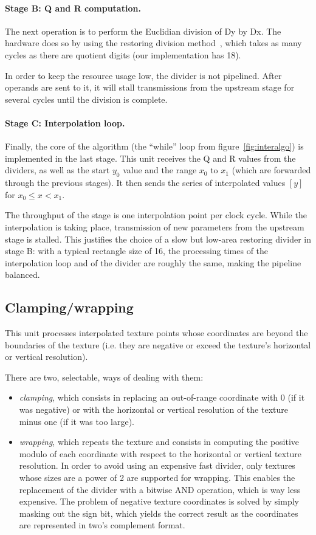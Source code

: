 \documentclass[a4paper,11pt]{kthesis}
\begin{document}
\paragraph{Stage B: Q and R computation.} The next operation is to perform the Euclidian division of Dy by Dx. The hardware does so by using the restoring division method~\cite{restdiv}, which takes as many cycles as there are quotient digits (our implementation has 18).

In order to keep the resource usage low, the divider is not pipelined. After operands are sent to it, it will stall transmissions from the upstream stage for several cycles until the division is complete.

\paragraph{Stage C: Interpolation loop.}
Finally, the core of the algorithm (the ``while'' loop from figure~\ref{fig:interalgo}) is implemented in the last stage. This unit receives the Q and R values from the dividers, as well as the start $y_{0}$ value and the range $x_{0}$ to $x_{1}$ (which are forwarded through the previous stages). It then sends the series of interpolated values $[y]$ for $x_{0} \leq x < x_{1}$.

The throughput of the stage is one interpolation point per clock cycle. While the interpolation is taking place, transmission of new parameters from the upstream stage is stalled. This justifies the choice of a slow but low-area restoring divider in stage B: with a typical rectangle size of 16, the processing times of the interpolation loop and of the divider are roughly the same, making the pipeline balanced.

\subsection{Clamping/wrapping}
This unit processes interpolated texture points whose coordinates are beyond the boundaries of the texture (i.e. they are negative or exceed the texture's horizontal or vertical resolution).

There are two, selectable, ways of dealing with them:
\begin{itemize}
\item \textit{clamping}, which consists in replacing an out-of-range coordinate with 0 (if it was negative) or with the horizontal or vertical resolution of the texture minus one (if it was too large).
\item \textit{wrapping}, which repeats the texture and consists in computing the positive modulo of each coordinate with respect to the horizontal or vertical texture resolution. In order to avoid using an expensive fast divider, only textures whose sizes are a power of 2 are supported for wrapping. This enables the replacement of the divider with a bitwise AND operation, which is way less expensive. The problem of negative texture coordinates is solved by simply masking out the sign bit, which yields the correct result as the coordinates are represented in two's complement format.
\end{itemize}
\end{document}
